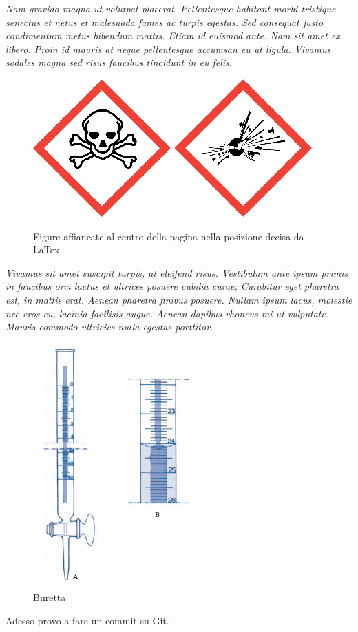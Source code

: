 \textit{Nam gravida magna ut volutpat placerat. Pellentesque habitant morbi tristique senectus et netus et malesuada fames ac turpis egestas. Sed consequat justo condimentum metus bibendum mattis. Etiam id euismod ante. Nam sit amet ex libero. Proin id mauris at neque pellentesque accumsan eu ut ligula. Vivamus sodales magna sed risus faucibus tincidunt in eu felis.}

\begin{figure}
    \centering
    \includegraphics[scale=0.2]{img/pittogrammi/Acute toxicity.png}
    \includegraphics[scale=0.2]{img/pittogrammi/Explosive.png}
    \caption{Figure affiancate al centro della pagina nella posizione decisa da LaTex}
    \label{fig:4}
\end{figure}

\textit{Vivamus sit amet suscipit turpis, at eleifend risus. Vestibulum ante ipsum primis in faucibus orci luctus et ultrices posuere cubilia curae; Curabitur eget pharetra est, in mattis erat. Aenean pharetra finibus posuere. Nullam ipsum lacus, molestie nec eros eu, lacinia facilisis augue. Aenean dapibus rhoncus mi ut vulputate. Mauris commodo ultricies nulla egestas porttitor.}

\begin{figure}[h]
    \centering
    \includegraphics{img/buretta.jpg}
    \caption{Buretta}
    \label{fig:5}
\end{figure}



Adesso provo a fare un commit su Git.
